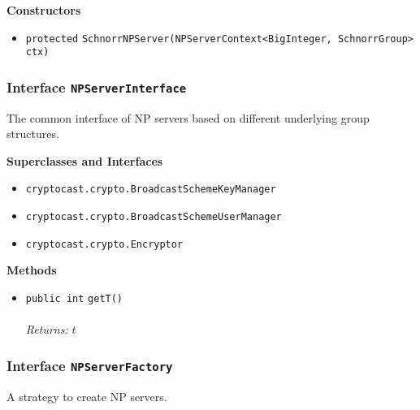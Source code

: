 \textbf{\sffamily Constructors}
\begin{itemize}
\item \lstinline|protected| \lstinline|SchnorrNPServer|\lstinline|(NPServerContext<BigInteger, SchnorrGroup> ctx)| \\[-0.6em]




\end{itemize}


\subsubsection{Interface \lstinline|NPServerInterface|}
The common interface of NP servers based on different underlying group
 structures. \\
\noindent\begin{minipage}[t]{5cm}
\vspace{0.3em}
\hspace*{2em}
\vspace{0.3em}
\end{minipage}



\textbf{\sffamily Superclasses and Interfaces}
\begin{itemize}
\item \lstinline|cryptocast.crypto.BroadcastSchemeKeyManager|
\item \lstinline|cryptocast.crypto.BroadcastSchemeUserManager|
\item \lstinline|cryptocast.crypto.Encryptor|
\end{itemize}



\textbf{\sffamily Methods}
\begin{itemize}
\item \lstinline|public int| \lstinline|getT|\lstinline|()|\\ \\[-0.6em]
\emph{Returns:} $t$



\end{itemize}

\subsubsection{Interface \lstinline|NPServerFactory|}
A strategy to create NP servers. \\
\noindent\begin{minipage}[t]{5cm}
\vspace{0.3em}
\hspace*{2em}
\vspace{0.3em}
\end{minipage}





